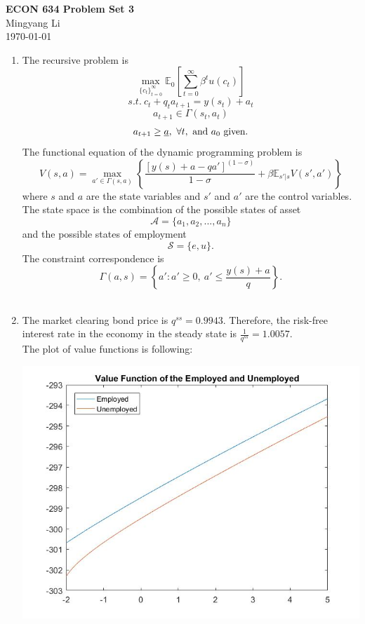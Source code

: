 \documentclass[12pt]{article}
\begin{document}
\begin{center}
\Large{\textbf{ECON 634 Problem Set 3}}\\[3mm]
\large{{Mingyang Li}}\\[1mm]
\today
\end{center}
\vfill

\begin{enumerate}
\item The recursive problem is 
$$\max_{\{c_t\}_{t=0}^\infty}\mathbb{E}_0\left[\sum_{t=0}^\infty\beta^t u(c_t)\right]$$
$$s.t.\ c_t+q_ta_{t+1}=y(s_t)+a_t$$
$$a_{t+1}\in\Gamma(s_t,a_t)$$
$$a_{t+1}\geq\underbar{$a$},\ \forall t,\ \text{and}\ a_0\ \text{given.}$$
The functional equation of the dynamic programming problem is
$$V(s,a)=\max_{a'\in\Gamma(s,a)} \left\{\frac{[y(s)+a-qa']^{(1-\sigma)}}{1-\sigma}+\beta\mathbb{E}_{s'|s}V(s',a')\right\}$$
where $s$ and $a$ are the state variables and $s'$ and $a'$ are the control variables.\\
The state space is the combination of the possible states of asset $$\mathscr{A}=\{a_1,a_2,...,a_n\}$$ and the possible states of employment $$\mathscr{S}=\{e,u\}.$$
The constraint correspondence is $$\Gamma(a,s)=\left\{a':a'\geq0,\ a'\leq\frac{y(s)+a}{q}\right\}.$$
\\[10mm]
\vfill
\item The market clearing bond price is $q^{ss} = 0.9943$. Therefore, the risk-free interest rate in the economy in the steady state is $\frac{1}{q^{ss}} = 1.0057$.\\The plot of value functions is following:
\begin{center}
  \includegraphics[width=130mm]{ValueFunction.jpg}

\end{center}
\end{enumerate}
\end{document}

